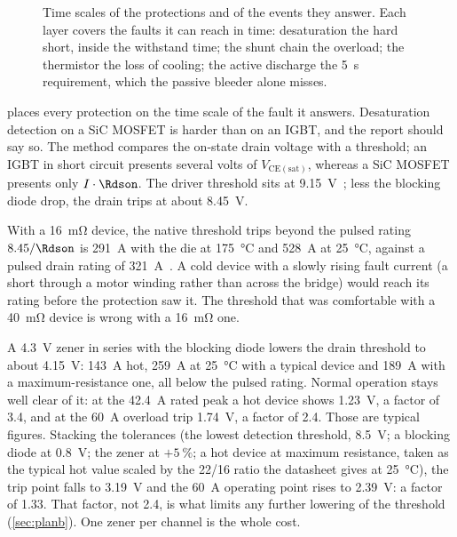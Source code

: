 \begin{figure}[htbp]
\centering

\caption{Time scales of the protections and of the events they answer. Each layer
covers the faults it can reach in time: desaturation the hard short, inside
the withstand time; the shunt chain the overload; the thermistor the loss
of cooling; the active discharge the \SI{5}{\second} requirement, which the
passive bleeder alone misses.}
\label{fig:protecttime}
\end{figure}

 places every protection on the time scale of the
fault it answers. Desaturation detection on a SiC MOSFET is harder than on
an IGBT, and the
report should say so. The method compares the on-state drain voltage with a
threshold; an IGBT in short circuit presents several volts of
$V_\mathrm{CE(sat)}$, whereas a SiC MOSFET presents only $I\cdot\Rdson$. The
driver threshold sits at \SI{9.15}{\volt}~\cite{ti_ucc21750}; less the
blocking diode drop, the drain trips at about \SI{8.45}{\volt}.

\begin{finding}{With a \SI{16}{\milli\ohm} device, the native threshold trips beyond the pulsed rating}
$8.45 / \Rdson$ is \SI{291}{\ampere} with the die at \SI{175}{\celsius}
and \SI{528}{\ampere} at \SI{25}{\celsius}, against a pulsed drain rating of
\SI{321}{\ampere}~\cite{wolfspeed_e3m0016}. A cold device with a slowly
rising fault current (a short through a motor winding rather than across the
bridge) would reach its rating before the protection saw it. The threshold
that was comfortable with a \SI{40}{\milli\ohm} device is wrong with a
\SI{16}{\milli\ohm} one.
\end{finding}

A \SI{4.3}{\volt} zener in series with the blocking diode lowers the drain
threshold to about \SI{4.15}{\volt}: \SI{143}{\ampere} hot, \SI{259}{\ampere}
at \SI{25}{\celsius} with a typical device and \SI{189}{\ampere} with a
maximum-resistance one, all below the pulsed rating. Normal operation stays
well clear of it: at the \SI{42.4}{\ampere} rated peak a hot device shows
\SI{1.23}{\volt}, a factor of 3.4, and at the \SI{60}{\ampere} overload trip
\SI{1.74}{\volt}, a factor of 2.4. Those are typical figures. Stacking the
tolerances (the lowest detection threshold, \SI{8.5}{\volt}; a blocking
diode at \SI{0.8}{\volt}; the zener at $+\SI{5}{\percent}$; a hot device at
maximum resistance, taken as the typical hot value scaled by the
\num{22}/\num{16} ratio the datasheet gives at \SI{25}{\celsius}), the trip
point falls to \SI{3.19}{\volt} and the \SI{60}{\ampere} operating point
rises to \SI{2.39}{\volt}: a factor of 1.33. That factor, not 2.4, is what
limits any further lowering of the threshold (\cref{sec:planb}). One zener
per channel is the whole cost.


